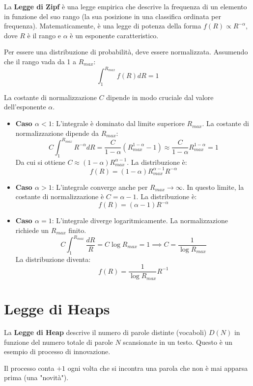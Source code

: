 La \textbf{Legge di Zipf} è una legge empirica che descrive la frequenza di un elemento in funzione del suo rango (la sua posizione in una classifica ordinata per frequenza). Matematicamente, è una legge di potenza della forma $f(R) \propto R^{-\alpha}$, dove $R$ è il rango e $\alpha$ è un esponente caratteristico.

Per essere una distribuzione di probabilità, deve essere normalizzata. Assumendo che il rango vada da 1 a $R_{max}$:
$$\int_{1}^{R_{max}} f(R) dR = 1$$

La costante di normalizzazione $C$ dipende in modo cruciale dal valore dell'esponente $\alpha$.

\begin{itemize}
    \item \textbf{Caso $\alpha < 1$}: L'integrale è dominato dal limite superiore $R_{max}$. La costante di normalizzazione dipende da $R_{max}$:
    $$C \int_{1}^{R_{max}} R^{-\alpha} dR = \frac{C}{1-\alpha}(R_{max}^{1-\alpha} - 1) \approx \frac{C}{1-\alpha}R_{max}^{1-\alpha} = 1$$
    Da cui si ottiene $C \approx (1-\alpha)R_{max}^{\alpha-1}$. La distribuzione è:
    $$f(R) = (1-\alpha)R_{max}^{\alpha-1} R^{-\alpha}$$
    
    \item \textbf{Caso $\alpha > 1$}: L'integrale converge anche per $R_{max} \to \infty$. In questo limite, la costante di normalizzazione è $C = \alpha - 1$. La distribuzione è:
    $$f(R) = (\alpha - 1) R^{-\alpha}$$
    
    \item \textbf{Caso $\alpha = 1$}: L'integrale diverge logaritmicamente. La normalizzazione richiede un $R_{max}$ finito.
    $$C \int_{1}^{R_{max}} \frac{dR}{R} = C \log R_{max} = 1 \implies C = \frac{1}{\log R_{max}}$$
    La distribuzione diventa:
    $$f(R) = \frac{1}{\log R_{max}} R^{-1}$$
    
\end{itemize}

\section{Legge di Heaps}

La \textbf{Legge di Heap}  descrive il numero di parole distinte (vocaboli) $D(N)$ in funzione del numero totale di parole $N$ scansionate in un testo. Questo è un esempio di processo di innovazione.



Il processo conta $+1$ ogni volta che si incontra una parola che non è mai apparsa prima (una "novità").

